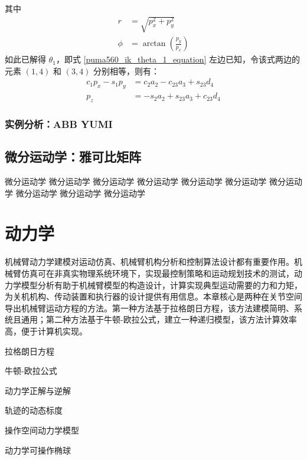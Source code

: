 \documentclass[cn,11pt,chinese,blue,bibstyle=ieeetr]{elegantbook}
\begin{document}
其中
\begin{equation}
	\begin{aligned}
		r &= \sqrt{p_x^2+p_y^2} \\
		\phi &=\arctan \left(\frac{p_y}{p_x}\right)
	\end{aligned}
\end{equation}
如此已解得 $\theta_1$，即式 \ref{puma560_ik_theta_1_equation} 左边已知，令该式两边的元素 $(1,4)$ 和 $(3,4)$ 分别相等，则有：
\begin{equation}
\begin{aligned}
c_1p_x-s_1p_y &= c_2a_2-c_{23}a_3+s_{23}d_4 \\
p_z &= -s_2a_2+s_{23}a_3+c_{23}d_4
\end{aligned}
\end{equation}




\subsection{实例分析：ABB YUMI}





\section{微分运动学：雅可比矩阵}\label{differential_kinematics_jacobi_matrix}

微分运动学
微分运动学
微分运动学
微分运动学
微分运动学
微分运动学
微分运动学
微分运动学
微分运动学
微分运动学





\chapter{动力学}
机械臂动力学建模对运动仿真、机械臂机构分析和控制算法设计都有重要作用。机械臂仿真可在非真实物理系统环境下，实现最控制策略和运动规划技术的测试，动力学模型分析有助于机械臂模型的构造设计，计算实现典型运动需要的力和力矩，为关机机构、传动装置和执行器的设计提供有用信息。本章核心是两种在关节空间导出机械臂运动方程的方法。第一种方法基于拉格朗日方程，该方法建模简明、系统且通用；第二种方法基于牛顿-欧拉公式，建立一种递归模型，该方法计算效率高，便于计算机实现。

\begin{introduction}
	\item 拉格朗日方程
	\item 牛顿-欧拉公式
	\item 动力学正解与逆解
	\item 轨迹的动态标度
	\item 操作空间动力学模型
	\item 动力学可操作椭球
\end{introduction}
\end{document}
